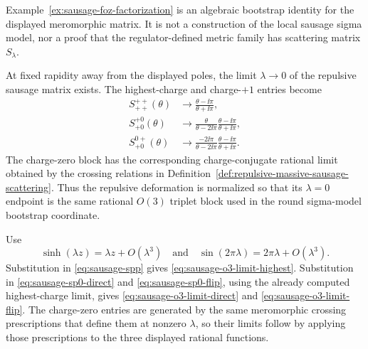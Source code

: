 Example~\ref{ex:sausage-foz-factorization} is an algebraic bootstrap
identity for the displayed meromorphic matrix.  It is not a construction of
the local sausage sigma model, nor a proof that the regulator-defined metric
family has scattering matrix \(S_\lambda\).

\begin{remark}
\label{rem:sausage-o3-rational-limit}
At fixed rapidity away from the displayed poles, the limit
\(\lambda\to0\) of the repulsive sausage matrix exists.  The highest-charge
and charge-\(+1\) entries become
\begin{align}
  S_{++}^{++}(\theta)
  &\longrightarrow
  \frac{\theta-\ii\pi}{\theta+\ii\pi},
  \label{eq:sausage-o3-limit-highest}\\
  S_{+0}^{+0}(\theta)
  &\longrightarrow
  \frac{\theta}{\theta-2\ii\pi}
  \frac{\theta-\ii\pi}{\theta+\ii\pi},
  \label{eq:sausage-o3-limit-direct}\\
  S_{+0}^{0+}(\theta)
  &\longrightarrow
  \frac{-2\ii\pi}{\theta-2\ii\pi}
  \frac{\theta-\ii\pi}{\theta+\ii\pi}.
  \label{eq:sausage-o3-limit-flip}
\end{align}
The charge-zero block has the corresponding charge-conjugate rational limit
obtained by the crossing relations in
Definition~\ref{def:repulsive-massive-sausage-scattering}.  Thus the
repulsive deformation is normalized so that its \(\lambda=0\) endpoint is the
same rational \(O(3)\) triplet block used in the round sigma-model bootstrap
coordinate.
\end{remark}

Use
\[
  \sinh(\lambda z)=\lambda z+O(\lambda^3)
  \quad\text{and}\quad
  \sin(2\pi\lambda)=2\pi\lambda+O(\lambda^3).
\]
Substitution in \eqref{eq:sausage-spp} gives
\eqref{eq:sausage-o3-limit-highest}.  Substitution in
\eqref{eq:sausage-sp0-direct} and \eqref{eq:sausage-sp0-flip}, using the
already computed highest-charge limit, gives
\eqref{eq:sausage-o3-limit-direct} and
\eqref{eq:sausage-o3-limit-flip}.  The charge-zero entries are generated by
the same meromorphic crossing prescriptions that define them at nonzero
\(\lambda\), so their limits follow by applying those prescriptions to the
three displayed rational functions.

